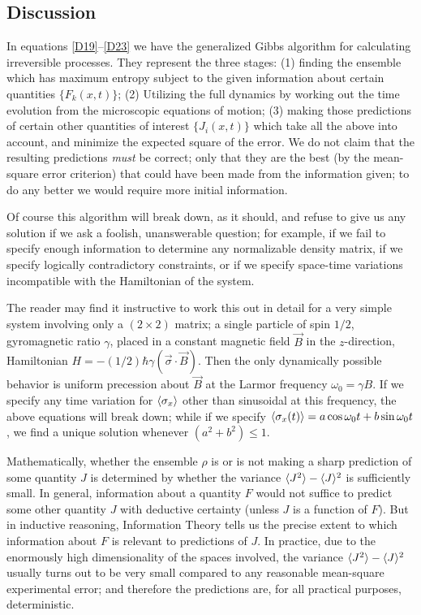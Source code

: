 \subsection{Discussion}
In equations \eqref{D19}--\eqref{D23} we have the generalized Gibbs algorithm for calculating irreversible processes.
They represent the three stages:
(1) finding the ensemble which has maximum entropy subject to the given information about certain quantities $\{F_k(x, t)\}$;
(2) Utilizing the full dynamics by working out the time evolution from the microscopic equations of motion;
(3) making those predictions of certain other quantities of interest $\{J_i(x, t)\}$ which take all the above into account, and minimize the expected square of the error.
We do not claim that the resulting predictions \emph{must} be correct; only that they are the best (by the mean-square error criterion) that could have been made from the information given; to do any better we would require more initial information.

Of course this algorithm will break down, as it should, and refuse to give us any solution if we ask a foolish, unanswerable question; for example, if we fail to specify enough information to determine any normalizable density matrix, if we specify logically contradictory constraints, or if we specify space-time variations incompatible with the Hamiltonian of the system.

The reader may find it instructive to work this out in detail for a very simple system involving only a $(2 \times 2)$ matrix; a single particle of spin $1/2$, gyromagnetic ratio $\gamma$, placed in a constant magnetic field $\vec{B}$ in the $z$-direction, Hamiltonian $H = -(1/2) \hbar \gamma (\vec{\sigma} \cdot \vec{B})$.
Then the only dynamically possible behavior is uniform precession about $\vec{B}$ at the Larmor frequency $\omega_0 = \gamma B$.
If we specify any time variation for $\langle\sigma_x\rangle$ other than sinusoidal at this frequency, the above equations will break down; while if we specify $\langle\sigma_x(t)\rangle = a \cos \omega_0 t  +  b \sin \omega_0 t$, we find a unique solution whenever $(a^2 + b^2) \leq 1$.

Mathematically, whether the ensemble $\rho$ is or is not making a sharp prediction of some quantity $J$ is determined by whether the variance $\langle J^2\rangle - \langle J\rangle^2$ is sufficiently small.
In general, information about a quantity $F$ would not suffice to predict some other quantity $J$ with deductive certainty (unless $J$ is a function of $F$).
But in inductive reasoning, Information Theory tells us the precise extent to which information about $F$ is relevant to predictions of $J$.
In practice, due to the enormously high dimensionality of the spaces involved, the variance $\langle J^2\rangle - \langle J\rangle^2$ usually turns out to be very small compared to any reasonable mean-square experimental error; and therefore the predictions are, for all practical purposes, deterministic.

